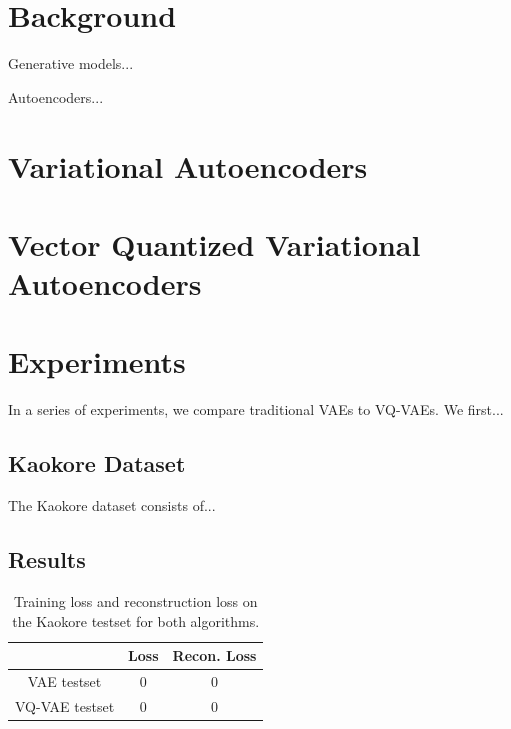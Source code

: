\documentclass{article}
\begin{document}
\section{Background}

Generative models...

Autoencoders...

\section{Variational Autoencoders}

\section{Vector Quantized Variational Autoencoders}

\section{Experiments}

In a series of experiments, we compare traditional VAEs to VQ-VAEs. We first...

\subsection{Kaokore Dataset}

The Kaokore dataset consists of...

\subsection{Results}

\begin{table}[t]
    \centering
    \begin{tabular}{c c c}
        & Loss & Recon. Loss \\
        \hline
        VAE testset & 0 & 0 \\
        VQ-VAE testset & 0 & 0
    \end{tabular}
    \caption{Training loss and reconstruction loss on the Kaokore testset for both algorithms.}
\end{table}
\end{document}

